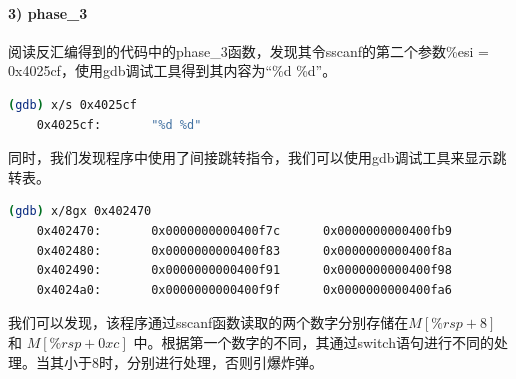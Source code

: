 \documentclass{article}
\begin{document}
\paragraph{3) phase\_3}

阅读反汇编得到的代码中的phase\_3函数，发现其令sscanf的第二个参数\%esi = 0x4025cf，使用gdb调试工具得到其内容为“\%d \%d”。

\begin{lstlisting}[language=bash]
    (gdb) x/s 0x4025cf
    0x4025cf:       "%d %d"
  \end{lstlisting}

同时，我们发现程序中使用了间接跳转指令，我们可以使用gdb调试工具来显示跳转表。

\begin{lstlisting}[language=bash]
    (gdb) x/8gx 0x402470
    0x402470:       0x0000000000400f7c      0x0000000000400fb9
    0x402480:       0x0000000000400f83      0x0000000000400f8a
    0x402490:       0x0000000000400f91      0x0000000000400f98
    0x4024a0:       0x0000000000400f9f      0x0000000000400fa6
\end{lstlisting}

我们可以发现，该程序通过sscanf函数读取的两个数字分别存储在$M[\%rsp + 8]$ 和 $M[\%rsp + 0xc]$ 中。根据第一个数字的不同，其通过switch语句进行不同的处理。当其小于8时，分别进行处理，否则引爆炸弹。
\end{document}
